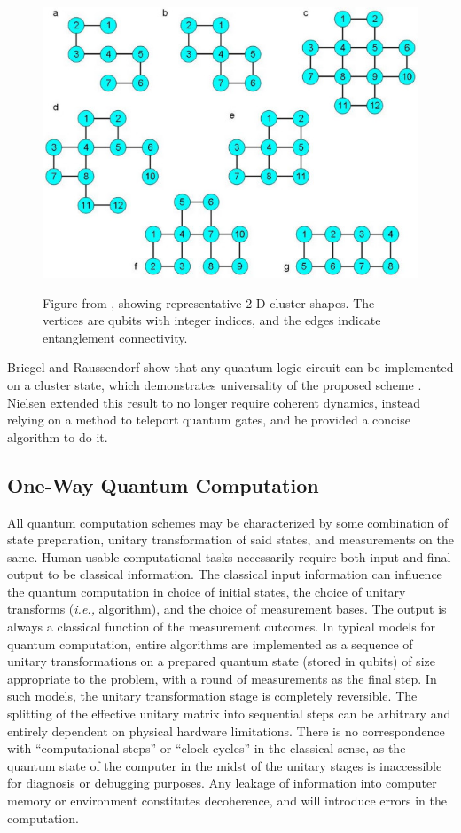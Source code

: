 \documentclass[twocolumn]{IEEEtran11}
\newcommand{\ie}{{\it i.e., }}
\newcommand{\clb}{\color{blue}}
\begin{document}
\begin{figure}[thb]
  \centering
  \includegraphics[width=\linewidth]{2d_clusters_rep.jpg}
  \label{2dclustersfig}
  \caption{Figure from \protect\cite{gerald2006efficient}, showing representative 2-D cluster shapes. The vertices are qubits with integer indices, and the edges indicate entanglement connectivity.}
\end{figure}

Briegel and Raussendorf show that any quantum logic circuit can be implemented on a cluster state, which demonstrates universality of the proposed scheme \cite{briegel2000measurements}. Nielsen \cite{nielsen108020universal} extended this result to no longer require coherent dynamics, instead relying on a method to teleport quantum gates, and he provided a concise algorithm to do it. 

\subsection{One-Way Quantum Computation}
\clb All quantum computation schemes may be characterized by some combination of state preparation, unitary transformation of said states, and measurements on the same. Human-usable computational tasks necessarily require both input and final output to be classical information. The classical input information can influence the quantum computation in choice of initial states, the choice of unitary transforms (\ie algorithm), and the choice of measurement bases. The output is always a classical function of the measurement outcomes. In typical models for quantum computation, entire algorithms are implemented as a sequence of unitary transformations on a prepared quantum state (stored in qubits) of size appropriate to the problem, with a round of measurements as the final step. In such models, the unitary transformation stage is completely reversible. The splitting of the effective unitary matrix into sequential steps can be arbitrary and entirely dependent on physical hardware limitations. There is no correspondence with ``computational steps'' or ``clock cycles'' in the classical sense, as the quantum state of the computer in the midst of the unitary stages is inaccessible for diagnosis or debugging purposes. Any leakage of information into computer memory or environment constitutes decoherence, and will introduce errors in the computation.
\end{document}
